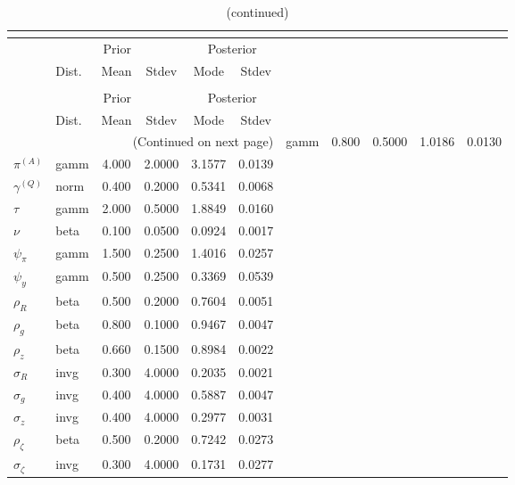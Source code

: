  
\begin{center}
\begin{longtable}{llcccc} 
\caption{Results from posterior maximization (parameters)}\\
 \label{Table:Posterior:1}\\
\toprule 
  & \multicolumn{3}{c}{Prior}  &  \multicolumn{2}{c}{Posterior} \\
  \cmidrule(r{.75em}){2-4} \cmidrule(r{.75em}){5-6}
  & Dist. & Mean  & Stdev & Mode & Stdev \\ 
\midrule \endfirsthead 
\caption{(continued)}\\
 \bottomrule 
  & \multicolumn{3}{c}{Prior}  &  \multicolumn{2}{c}{Posterior} \\
  \cmidrule(r{.75em}){2-4} \cmidrule(r{.75em}){5-6}
  & Dist. & Mean  & Stdev & Mode & Stdev \\ 
\midrule \endhead 
\bottomrule \multicolumn{6}{r}{(Continued on next page)}\endfoot 
\bottomrule\endlastfoot 
${r_{A}}$ & gamm &   0.800 & 0.5000 &   1.0186 &  0.0130 \\ 
${\pi^{(A)}}$ & gamm &   4.000 & 2.0000 &   3.1577 &  0.0139 \\ 
${\gamma^{(Q)}}$ & norm &   0.400 & 0.2000 &   0.5341 &  0.0068 \\ 
${\tau}$ & gamm &   2.000 & 0.5000 &   1.8849 &  0.0160 \\ 
${\nu}$ & beta &   0.100 & 0.0500 &   0.0924 &  0.0017 \\ 
${\psi_\pi}$ & gamm &   1.500 & 0.2500 &   1.4016 &  0.0257 \\ 
${\psi_y}$ & gamm &   0.500 & 0.2500 &   0.3369 &  0.0539 \\ 
${\rho_R}$ & beta &   0.500 & 0.2000 &   0.7604 &  0.0051 \\ 
${\rho_{g}}$ & beta &   0.800 & 0.1000 &   0.9467 &  0.0047 \\ 
${\rho_z}$ & beta &   0.660 & 0.1500 &   0.8984 &  0.0022 \\ 
${\sigma_R}$ & invg &   0.300 & 4.0000 &   0.2035 &  0.0021 \\ 
${\sigma_{g}}$ & invg &   0.400 & 4.0000 &   0.5887 &  0.0047 \\ 
${\sigma_z}$ & invg &   0.400 & 4.0000 &   0.2977 &  0.0031 \\ 
${\rho_\zeta}$ & beta &   0.500 & 0.2000 &   0.7242 &  0.0273 \\ 
${\sigma_\zeta}$ & invg &   0.300 & 4.0000 &   0.1731 &  0.0277 \\ 
\end{longtable}
 \end{center}
